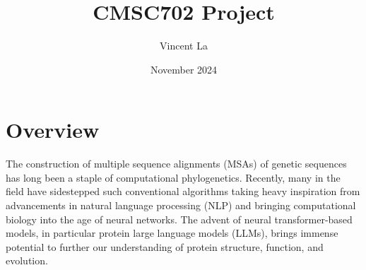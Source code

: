 \documentclass{article}
\title{CMSC702 Project}
\author{Vincent La}
\date{November 2024}
\begin{document}
\maketitle


\section{Overview}
The construction of multiple sequence alignments (MSAs) of genetic sequences has long been a staple of computational phylogenetics. Recently, many in the field have sidestepped such conventional algorithms taking heavy inspiration from advancements in natural language processing (NLP) and bringing computational biology into the age of neural networks. The advent of neural transformer-based models, in particular protein large language models (LLMs), brings immense potential to further our understanding of protein structure, function, and evolution. 
\end{document}
